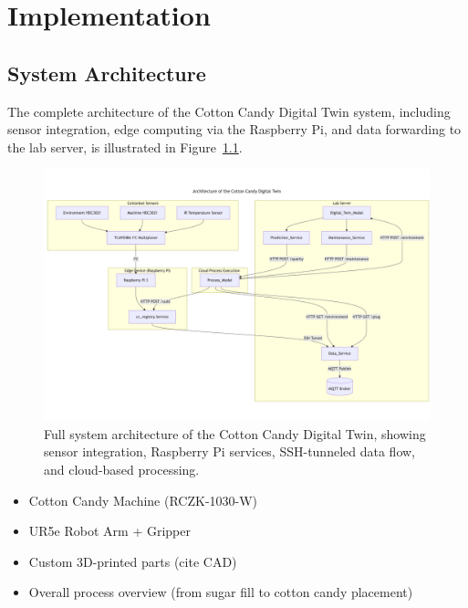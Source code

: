 \chapter{Implementation}
\label{sec:implementation}

\section{System Architecture}
The complete architecture of the Cotton Candy Digital Twin system, including sensor integration, edge computing via the Raspberry Pi, and data forwarding to the lab server, is illustrated in Figure~\ref{fig:ccdt-architecture}.

\begin{figure}[ht]
    \centering
    \includegraphics[width=0.9\linewidth]{figures/Architecture of the CC DT.png}
    \caption{Full system architecture of the Cotton Candy Digital Twin, showing sensor integration, Raspberry Pi services, SSH-tunneled data flow, and cloud-based processing.}
    \label{fig:ccdt-architecture}
\end{figure}

\begin{itemize}
  \item Cotton Candy Machine (RCZK-1030-W)
  \item UR5e Robot Arm + Gripper
  \item Custom 3D-printed parts (cite CAD)
  \item Overall process overview (from sugar fill to cotton candy placement)
\end{itemize}

